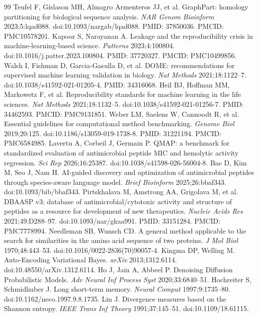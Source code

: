 \documentclass[unnumsec,webpdf,contemporary,large]{oup-authoring-template}
\begin{document}
\begin{thebibliography}{99}
 Teufel F, Gíslason MH, Almagro Armenteros JJ, et al. GraphPart: homology partitioning for biological sequence analysis. \textit{NAR Genom Bioinform} 2023;5:lqad088. doi:10.1093/nargab/lqad088. PMID: 37850036. PMCID: PMC10578201.
 Kapoor S, Narayanan A. Leakage and the reproducibility crisis in machine-learning-based science. \textit{Patterns} 2023;4:100804. doi:10.1016/j.patter.2023.100804. PMID: 37720327. PMCID: PMC10499856.
 Walsh I, Fishman D, Garcia-Gasulla D, et al. DOME: recommendations for supervised machine learning validation in biology. \textit{Nat Methods} 2021;18:1122--7. doi:10.1038/s41592-021-01205-4. PMID: 34316068.
 Heil BJ, Hoffman MM, Markowetz F, et al. Reproducibility standards for machine learning in the life sciences. \textit{Nat Methods} 2021;18:1132--5. doi:10.1038/s41592-021-01256-7. PMID: 34462593. PMCID: PMC9131851.
 Weber LM, Saelens W, Cannoodt R, et al. Essential guidelines for computational method benchmarking. \textit{Genome Biol} 2019;20:125. doi:10.1186/s13059-019-1738-8. PMID: 31221194. PMCID: PMC6584985.
 Lavertu A, Corbeil J, Germain P. QMAP: a benchmark for standardized evaluation of antimicrobial peptide MIC and hemolytic activity regression. \textit{Sci Rep} 2026;16:25387. doi:10.1038/s41598-026-56004-8.
 Bae D, Kim M, Seo J, Nam H. AI-guided discovery and optimization of antimicrobial peptides through species-aware language model. \textit{Brief Bioinform} 2025;26:bbaf343. doi:10.1093/bib/bbaf343.
 Pirtskhalava M, Amstrong AA, Grigolava M, et al. DBAASP v3: database of antimicrobial/cytotoxic activity and structure of peptides as a resource for development of new therapeutics. \textit{Nucleic Acids Res} 2021;49:D288--97. doi:10.1093/nar/gkaa991. PMID: 33151284. PMCID: PMC7778994.
 Needleman SB, Wunsch CD. A general method applicable to the search for similarities in the amino acid sequence of two proteins. \textit{J Mol Biol} 1970;48:443--53. doi:10.1016/0022-2836(70)90057-4.
 Kingma DP, Welling M. Auto-Encoding Variational Bayes. \textit{arXiv} 2013;1312.6114. doi:10.48550/arXiv.1312.6114.
 Ho J, Jain A, Abbeel P. Denoising Diffusion Probabilistic Models. \textit{Adv Neural Inf Process Syst} 2020;33:6840--51.
 Hochreiter S, Schmidhuber J. Long short-term memory. \textit{Neural Comput} 1997;9:1735--80. doi:10.1162/neco.1997.9.8.1735.
 Lin J. Divergence measures based on the Shannon entropy. \textit{IEEE Trans Inf Theory} 1991;37:145--51. doi:10.1109/18.61115.

\end{thebibliography}
\end{document}
